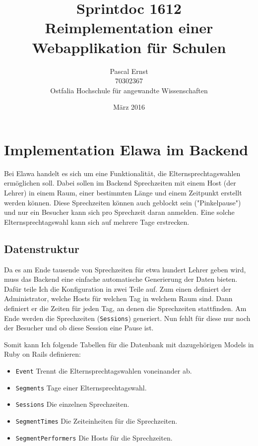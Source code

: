\documentclass[a4paper,10pt]{scrartcl}
\begin{document}
\title{Sprintdoc 1612 \\
  Reimplementation einer Webapplikation für Schulen}
\author{Pascal Ernst\\
  70302367 \\
  Ostfalia Hochschule für angewandte Wissenschaften}
\date{März 2016}
\maketitle

\newpage

\section{Implementation Elawa im Backend}

  Bei Elawa handelt es sich um eine Funktionalität, die Elternsprechtagswahlen
  ermöglichen soll.
  Dabei sollen im Backend Sprechzeiten mit einem Host (der Lehrer) in einem
  Raum, einer bestimmten Länge und einem Zeitpunkt erstellt werden können.
  Diese Sprechzeiten können auch geblockt sein ("Pinkelpause") und nur ein
  Besucher kann sich pro Sprechzeit daran anmelden.
  Eine solche Elternsprechtagswahl kann sich auf mehrere Tage erstrecken.

  \subsection{Datenstruktur}

    Da es am Ende tausende von Sprechzeiten für etwa hundert Lehrer geben wird,
    muss das Backend eine einfache automatische Generierung der Daten bieten.
    Dafür teile Ich die Konfiguration in zwei Teile auf.
    Zum einen definiert der Administrator, welche Hosts für welchen Tag in
    welchem Raum sind.
    Dann definiert er die Zeiten für jeden Tag, an denen die Sprechzeiten
    stattfinden.
    Am Ende werden die Sprechzeiten (\lstinline{Sessions}) generiert.
    Nun fehlt für diese nur noch der Besucher und ob diese Session eine Pause
    ist.

    Somit kann Ich folgende Tabellen für die Datenbank mit dazugehörigen Models
    in Ruby on Rails definieren:

    \begin{itemize}
      \item \lstinline{Event} Trennt die Elternsprechtagswahlen voneinander ab.
      \item \lstinline{Segments} Tage einer Elternsprechtagswahl.
      \item \lstinline{Sessions} Die einzelnen Sprechzeiten.
      \item \lstinline{SegmentTimes} Die Zeiteinheiten für die Sprechzeiten.
      \item \lstinline{SegmentPerformers} Die Hosts für die Sprechzeiten.
    \end{itemize}
\end{document}

